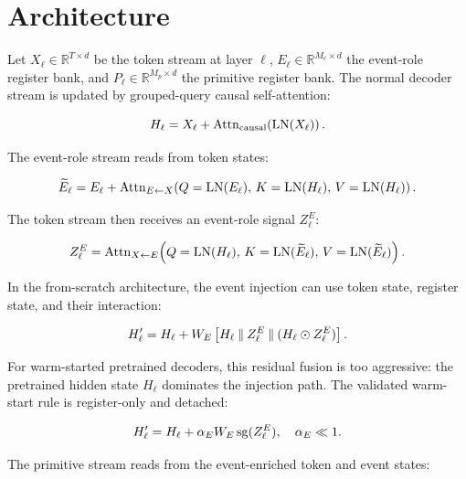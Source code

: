 \section{Architecture}
\label{sec:architecture}

Let $X_\ell \in \mathbb{R}^{T \times d}$ be the token stream at layer $\ell$,
$E_\ell \in \mathbb{R}^{M_e \times d}$ the event-role register bank, and
$P_\ell \in \mathbb{R}^{M_p \times d}$ the primitive register bank. The normal
decoder stream is updated by grouped-query causal self-attention:

\begin{equation}
H_\ell = X_\ell + \operatorname{Attn}_{\mathrm{causal}}\!\left(\operatorname{LN}(X_\ell)\right).
\label{eq:token_update}
\end{equation}

The event-role stream reads from token states:

\begin{equation}
\widetilde{E}_\ell =
E_\ell +
\operatorname{Attn}_{E \leftarrow X}\!\left(
Q=\operatorname{LN}(E_\ell),\,
K=\operatorname{LN}(H_\ell),\,
V=\operatorname{LN}(H_\ell)
\right).
\label{eq:event_read}
\end{equation}

The token stream then receives an event-role signal $Z^E_\ell$:

\begin{equation}
Z^E_\ell =
\operatorname{Attn}_{X \leftarrow E}\!\left(
Q=\operatorname{LN}(H_\ell),\,
K=\operatorname{LN}(\widetilde{E}_\ell),\,
V=\operatorname{LN}(\widetilde{E}_\ell)
\right).
\label{eq:event_write}
\end{equation}

In the from-scratch architecture, the event injection can use token state,
register state, and their interaction:

\begin{equation}
H'_\ell = H_\ell + W_E \left[H_\ell \mathbin{\Vert} Z^E_\ell \mathbin{\Vert}
                    (H_\ell \odot Z^E_\ell)\right].
\label{eq:residual_injection}
\end{equation}

For warm-started pretrained decoders, this residual fusion is too aggressive:
the pretrained hidden state $H_\ell$ dominates the injection path. The validated
warm-start rule is register-only and detached:

\begin{equation}
H'_\ell = H_\ell + \alpha_E W_E \operatorname{sg}(Z^E_\ell),
\quad \alpha_E \ll 1.
\label{eq:warmstart_injection}
\end{equation}

The primitive stream reads from the event-enriched token and event states:

